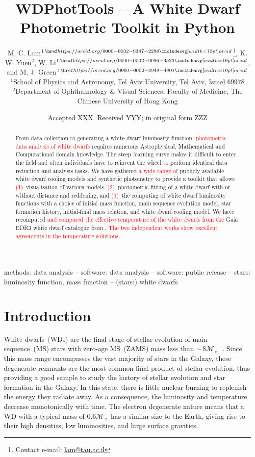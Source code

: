 \documentclass[fleqn,usenatbib]{rasti}
\title[WD Photometric Toolkit]{WDPhotTools -- A White Dwarf Photometric Toolkit in Python}
\author[M. C. Lam et al.]{
M. C. Lam$^{1\,\orcid{0000-0002-9347-2298}}$\thanks{Contact e-mail: \href{mailto:lam@tau.ac.il}{lam@tau.ac.il}},
K. W. Yuen$^{2}$,
W. Li$^{1\,\orcid{0000-0002-0096-3523}}$, and
M. J. Green$^{1\,\orcid{0000-0002-0948-4801}}$\\
$^{1}$School of Physics and Astronomy, Tel Aviv University, Tel Aviv, Israel 69978\\
$^{2}$Department of Ophthalmology \& Visual Sciences, Faculty of Medicine, The Chinese University of Hong Kong
}
\date{Accepted XXX. Received YYY; in original form ZZZ}
\newcommand{\msun}{\mathcal{M}_{\sun}}
\begin{document}
\label{firstpage}
\pagerange{\pageref{firstpage}--\pageref{lastpage}}
\maketitle

\begin{abstract}
From data collection to generating a white dwarf luminosity function,
\textcolor{red}{photometric data analysis of white dwarfs} requires numerous
Astrophysical, Mathematical and Computational domain knowledge. The steep
learning curve makes it difficult to enter the field and often individuals
have to reinvent the wheel to perform identical data reduction and analysis
tasks. We have gathered \textcolor{red}{a wide range of} publicly available
white dwarf cooling models and synthetic photometry to provide a toolkit that
allows \textcolor{red}{(1)}~visualisation of various models,
\textcolor{red}{(2)}~photometric fitting of a white dwarf with or without
distance and reddening, and \textcolor{red}{(3)}~the computing of white
dwarf luminosity functions with a choice of initial mass function, main
sequence evolution model, star formation history, initial-final mass relation,
and white dwarf cooling model. We have recomputed \textcolor{red}{and compared
the effective temperature of the white dwarfs from the} Gaia EDR3 white dwarf
catalogue from \citet{2021MNRAS.508.3877G}. \textcolor{red}{The two independent
works show excellent agreements in the temperature solutions}.
\end{abstract}

\begin{keywords}
methods: data analysis -- software: data analysis -- software: public release -- stars: luminosity function, mass function -- (stars:) white dwarfs
\end{keywords}


\section{Introduction}
White dwarfs~(WDs) are the final stage of stellar evolution of main
sequence~(MS) stars with zero-age MS~(ZAMS) mass less than
$\sim$\,$8\msun$~\citep{2013sse..book.....K}. Since this
mass range encompasses the vast majority of stars in the Galaxy, these
degenerate remnants are the most common final product of stellar evolution,
thus providing a good sample to study the history of stellar evolution and star
formation in the Galaxy. In this state, there is little nuclear burning to
replenish the energy they radiate away. As a consequence, the luminosity and
temperature decrease monotonically with time. The electron degenerate nature
means that a WD with a typical mass of $0.6\mathcal{M}_{\sun}$ has a similar
size to the Earth, giving rise to their high densities, low luminosities, and
large surface gravities.
\end{document}
